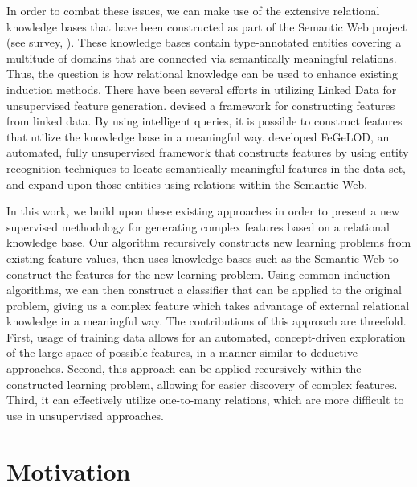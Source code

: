 \documentclass[twoside,11pt]{article}
\theoremstyle{definition}
\begin{document}
In order to combat these issues, we can make use of the extensive relational knowledge bases that have been constructed as part of the Semantic Web project (see survey, ). These knowledge bases contain type-annotated entities covering a multitude of domains that are connected via semantically meaningful relations. Thus, the question is how relational knowledge can be used to enhance existing induction methods.
There have been several efforts in utilizing Linked Data for unsupervised feature generation.  devised a framework for constructing features from linked data. By using intelligent queries, it is possible to construct features that utilize the knowledge base in a meaningful way. 
 developed FeGeLOD, an automated, fully unsupervised framework that constructs features by using entity recognition techniques to locate semantically meaningful features in the data set, and expand upon those entities using relations within the Semantic Web. %

In this work, we build upon these existing approaches in order to present a new supervised methodology for generating complex features based on a relational knowledge base. Our algorithm recursively constructs new learning problems from existing feature values, then uses knowledge bases such as the Semantic Web to construct the features for the new learning problem.
Using common induction algorithms, we can then construct a classifier that can be applied to the original problem, giving us a complex feature which takes advantage of external relational knowledge in a meaningful way.
The contributions of this approach are threefold. First, usage of training data allows for an automated, concept-driven exploration of the large space of possible features, in a manner similar to deductive approaches. Second, this approach can be applied recursively within the constructed learning problem, allowing for easier discovery of complex features. Third, it can effectively utilize one-to-many relations, which are more difficult to use in unsupervised approaches.

\section{Motivation} \label{motivation}
\end{document}
